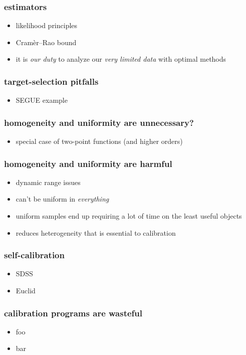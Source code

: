 \documentclass[pdftex]{beamer}
\begin{document}
\begin{frame}
  \frametitle{estimators}
  \begin{itemize}
  \item likelihood principles
  \item Cram\`er--Rao bound
  \item it is \emph{our duty} to analyze our \emph{very limited data} with optimal methods
  \end{itemize}
\end{frame}

\begin{frame}
  \frametitle{target-selection pitfalls}
  \begin{itemize}
  \item SEGUE example
  \end{itemize}
\end{frame}

\begin{frame}
  \frametitle{homogeneity and uniformity are unnecessary?}
  \begin{itemize}
  \item special case of two-point functions (and higher orders)
  \end{itemize}
\end{frame}

\begin{frame}
  \frametitle{homogeneity and uniformity are harmful}
  \begin{itemize}
  \item dynamic range issues
  \item can't be uniform in \emph{everything}
  \item uniform samples end up requiring a lot of time on the least useful objects
  \item reduces heterogeneity that is essential to calibration
  \end{itemize}
\end{frame}

\begin{frame}
  \frametitle{self-calibration}
  \begin{itemize}
  \item SDSS
  \item Euclid
  \end{itemize}
\end{frame}

\begin{frame}
  \frametitle{calibration programs are wasteful}
  \begin{itemize}
  \item foo
  \item bar
  \end{itemize}
\end{frame}
\end{document}
